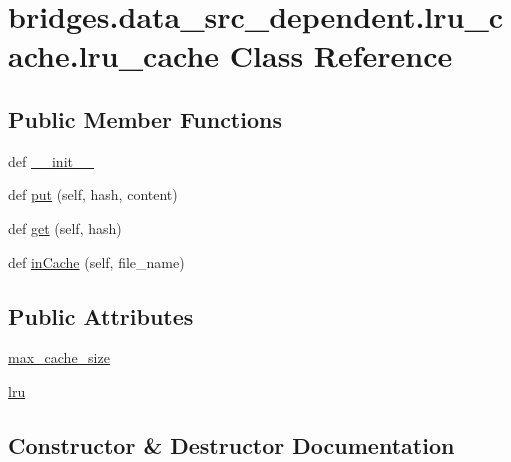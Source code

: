 \hypertarget{classbridges_1_1data__src__dependent_1_1lru__cache_1_1lru__cache}{}\section{bridges.\+data\+\_\+src\+\_\+dependent.\+lru\+\_\+cache.\+lru\+\_\+cache Class Reference}
\label{classbridges_1_1data__src__dependent_1_1lru__cache_1_1lru__cache}
\subsection*{Public Member Functions}
\begin{DoxyCompactItemize}
\item 
def \mbox{\hyperlink{classbridges_1_1data__src__dependent_1_1lru__cache_1_1lru__cache_a66d09fd9beb3e82c94960960456fc6f7}{\+\_\+\+\_\+init\+\_\+\+\_\+}}
\item 
def \mbox{\hyperlink{classbridges_1_1data__src__dependent_1_1lru__cache_1_1lru__cache_a98b97dd34aeaec0856bbc560cbac2866}{put}} (self, hash, content)
\item 
def \mbox{\hyperlink{classbridges_1_1data__src__dependent_1_1lru__cache_1_1lru__cache_a808ebb43936c26cae242752509e3e772}{get}} (self, hash)
\item 
def \mbox{\hyperlink{classbridges_1_1data__src__dependent_1_1lru__cache_1_1lru__cache_abfd53102b85993476f3dc75416811761}{in\+Cache}} (self, file\+\_\+name)
\end{DoxyCompactItemize}
\subsection*{Public Attributes}
\begin{DoxyCompactItemize}
\item 
\mbox{\hyperlink{classbridges_1_1data__src__dependent_1_1lru__cache_1_1lru__cache_a87a170ed62886de32e1bbf0d9ac05cfd}{max\+\_\+cache\+\_\+size}}
\item 
\mbox{\hyperlink{classbridges_1_1data__src__dependent_1_1lru__cache_1_1lru__cache_a2568c6b5de855a1ad90f876276b8cf49}{lru}}
\end{DoxyCompactItemize}


\subsection{Constructor \& Destructor Documentation}
\mbox{\label{classbridges_1_1data__src__dependent_1_1lru__cache_1_1lru__cache_a66d09fd9beb3e82c94960960456fc6f7}} 
